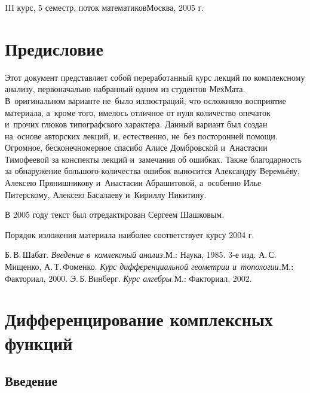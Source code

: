 \documentclass[a4paper]{article}
\begin{document}
{III курс, 5 семестр, поток математиков}{Москва, 2005 г.}

\tableofcontents

\pagebreak

\section*{Предисловие}

Этот документ представляет собой переработанный курс лекций по комплексному анализу,
первоначально набранный одним из студентов МехМата. В~оригинальном варианте не~было иллюстраций, что осложняло
восприятие материала, а~кроме того, имелось отличное от нуля количество опечаток и~прочих глюков
типографского характера. Данный вариант был создан на~основе авторских лекций, и, естественно, не~без
посторонней помощи.
Огромное, бесконечномерное спасибо Алисе Домбровской и~Анастасии Тимофеевой за
конспекты лекций и~замечания об ошибках. Также благодарность за обнаружение большого количества ошибок
выносится Александру Веремьёву, Алексею Прянишникову и~Анастасии Абрашитовой, а~особенно Илье Питерскому,
Алексею Басалаеву и~Кириллу Никитину.

В 2005 году текст был отредактирован Сергеем Шашковым.

Порядок изложения материала наиболее соответствует курсу 2004 г.

\medskip
\dmvntrail

\begin{thebibliography}{4}
\setlength\itemsep{-.5mm}
    Б.\,В.\,Шабат. \emph{Введение в~комлексный анализ.}\т М.: Наука, 1985. 3-е изд.
    А.\,С.\,Мищенко, А.\,Т.\,Фоменко. \emph{Курс дифференциальной геометрии и~топологии.}\т М.: Факториал, 2000.
    Э.\,Б.\,Винберг. \emph{Курс алгебры.}\т М.: Факториал, 2002.
\end{thebibliography}

\pagebreak

\section{Дифференцирование комплексных функций}

\subsection{Введение}
\end{document}
